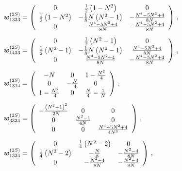 \documentclass[a4paper,11pt]{article}
\newcommand{\bfw}{\bm{w}}
\numberwithin{equation}{section}
\begin{document}
\begin{subequations}
\allowdisplaybreaks
\begin{align}
    \bfw_{1333}^{(2S)}  & = 
\left(
\begin{array}{ccc}
 0 & \frac{1}{2} \left(1-N^2\right) & 0 \\
 \frac{1}{2} \left(1-N^2\right) & -\frac{1}{8} N \left(N^2-1\right) &
-\frac{N^4-5 N^2+4}{8 N} \\
 0 & -\frac{N^4-5 N^2+4}{8 N} & -\frac{N^4-5 N^2+4}{8 N} \\
\end{array}
\right)
    \,,\\[0.5em]
    \bfw_{1433}^{(2S)}  & = 
\left(
\begin{array}{ccc}
 0 & \frac{1}{2} \left(N^2-1\right) & 0 \\
 \frac{1}{2} \left(N^2-1\right) & -\frac{1}{8} N \left(N^2-1\right) &
\frac{N^4-5 N^2+4}{8 N} \\
 0 & \frac{N^4-5 N^2+4}{8 N} & -\frac{N^4-5 N^2+4}{8 N} \\
\end{array}
\right)
    \,,\\[0.5em]
    \bfw_{1314}^{(2S)}  & = 
\left(
\begin{array}{ccc}
 -N & 0 & 1-\frac{N^2}{4} \\
 0 & -\frac{N}{4} & 0 \\
 1-\frac{N^2}{4} & 0 & \frac{N}{4}-\frac{1}{N} \\
\end{array}
\right)
    \,,\\[0.5em]
    \bfw_{3334}^{(2S)}  & = 
\left(
\begin{array}{ccc}
 -\frac{\left(N^2-1\right)^2}{2 N} & 0 & 0 \\
 0 & \frac{N^2-1}{4 N} & 0 \\
 0 & 0 & \frac{N^4-5 N^2+4}{4 N^3} \\
\end{array}
\right)
    \,,\\[0.5em]
    \bfw_{1334}^{(2S)}  & = 
\left(
\begin{array}{ccc}
 0 & \frac{1}{4} \left(N^2-2\right) & 0 \\
 \frac{1}{4} \left(N^2-2\right) & -\frac{N}{8} & -\frac{N^2-4}{8 N} \\
 0 & -\frac{N^2-4}{8 N} & -\frac{N^2-4}{8 N} \\
\end{array}
\right)
    \,,\\[0.5em]

\end{align}
\end{subequations}
\end{document}
